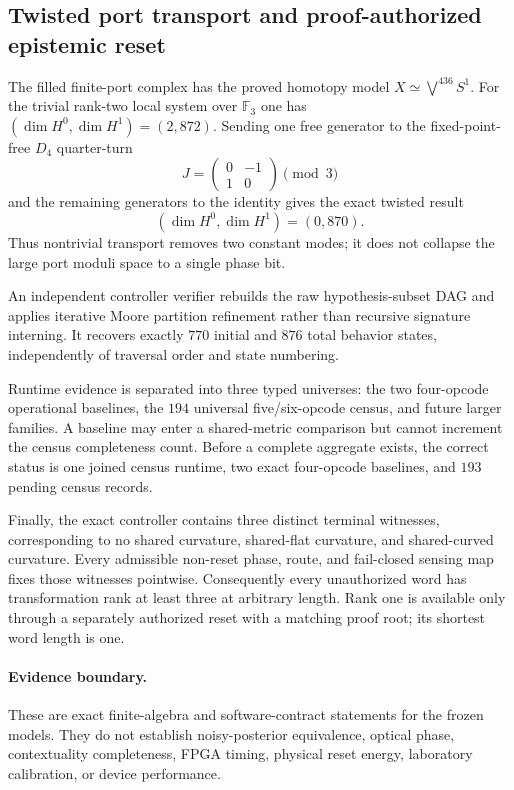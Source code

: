 \subsection{Twisted port transport and proof-authorized epistemic reset}
\label{sec:bt3274-bt3285}

The filled finite-port complex has the proved homotopy model
$X\simeq\bigvee^{436}S^1$.  For the trivial rank-two local system over
$\mathbb F_3$ one has $(\dim H^0,\dim H^1)=(2,872)$.  Sending one free
generator to the fixed-point-free $D_4$ quarter-turn
\[
J=\begin{pmatrix}0&-1\\1&0\end{pmatrix}\pmod3
\]
and the remaining generators to the identity gives the exact twisted result
\[
\boxed{(\dim H^0,\dim H^1)=(0,870).}
\]
Thus nontrivial transport removes two constant modes; it does not collapse the
large port moduli space to a single phase bit.

An independent controller verifier rebuilds the raw hypothesis-subset DAG and
applies iterative Moore partition refinement rather than recursive signature
interning.  It recovers exactly $770$ initial and $876$ total behavior states,
independently of traversal order and state numbering.

Runtime evidence is separated into three typed universes: the two four-opcode
operational baselines, the $194$ universal five/six-opcode census, and future
larger families.  A baseline may enter a shared-metric comparison but cannot
increment the census completeness count.  Before a complete aggregate exists,
the correct status is one joined census runtime, two exact four-opcode
baselines, and $193$ pending census records.

Finally, the exact controller contains three distinct terminal witnesses,
corresponding to no shared curvature, shared-flat curvature, and shared-curved
curvature.  Every admissible non-reset phase, route, and fail-closed sensing
map fixes those witnesses pointwise.  Consequently every unauthorized word
has transformation rank at least three at arbitrary length.  Rank one is
available only through a separately authorized reset with a matching proof
root; its shortest word length is one.

\paragraph{Evidence boundary.}
These are exact finite-algebra and software-contract statements for the frozen
models.  They do not establish noisy-posterior equivalence, optical phase,
contextuality completeness, FPGA timing, physical reset energy, laboratory
calibration, or device performance.

